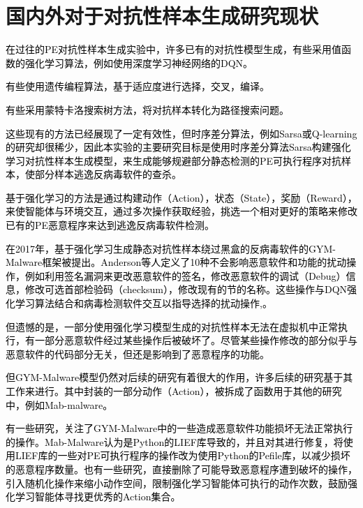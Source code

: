 \section{国内外对于对抗性样本生成研究现状}

\textcolor{black}{在过往的PE对抗性样本生成实验中，许多已有的对抗性模型生成，有些采用值函数的强化学习算法，例如使用深度学习神经网络的DQN\parencite{ref9}。}

\textcolor{black}{有些使用遗传编程算法，基于适应度进行选择，交叉，编译\parencite{ref10}。}

\textcolor{black}{有些采用蒙特卡洛搜索树方法，将对抗样本转化为路径搜索问题\parencite{ref11}。}

\textcolor{black}{这些现有的方法已经展现了一定有效性，但时序差分算法，例如Sarsa或Q-learning的研究却很稀少，因此本实验的主要研究目标是使用时序差分算法Sarsa构建强化学习对抗性样本生成模型，来生成能够规避部分静态检测的PE可执行程序对抗样本，使部分样本逃逸反病毒软件的查杀。}

\textcolor{black}{基于强化学习的方法是通过构建动作（Action），状态（State），奖励（Reward），来使智能体与环境交互，通过多次操作获取经验，挑选一个相对更好的策略来修改已有的PE恶意程序来达到逃逸反病毒软件检测。}

\textcolor{black}{在2017年，基于强化学习生成静态对抗性样本绕过黑盒的反病毒软件的GYM-Malware框架被提出。Anderson等人定义了10种不会影响恶意软件和功能的扰动操作，例如利用签名漏洞来更改恶意软件的签名，修改恶意软件的调试（Debug）信息，修改可选首部检验码（checksum），修改现有的节的名称。这些操作与DQN强化学习算法结合和病毒检测软件交互以指导选择的扰动操作\parencite{ref9},\parencite{ref13}。}

\textcolor{black}{但遗憾的是，一部分使用强化学习模型生成的对抗性样本无法在虚拟机中正常执行，有一部分恶意软件经过某些操作后被破坏了。尽管某些操作修改的部分似乎与恶意软件的代码部分无关，但还是影响到了恶意程序的功能\parencite{ref8}。}

\textcolor{black}{但GYM-Malware模型仍然对后续的研究有着很大的作用，许多后续的研究基于其工作来进行。其中封装的一部分动作（Action），被拆成了函数用于其他的研究中，例如Mab-malware。}

\textcolor{black}{有一些研究\parencite{ref14}，关注了GYM-Malware中的一些造成恶意软件功能损坏无法正常执行的操作。Mab-Malware认为是Python的LIEF库导致的，并且对其进行修复，将使用LIEF库的一些对PE可执行程序的操作改为使用Python的Pefile库，以减少损坏的恶意程序数量。也有一些研究\parencite{ref15}，直接删除了可能导致恶意程序遭到破坏的操作，引入随机化操作来缩小动作空间，限制强化学习智能体可执行的动作次数，鼓励强化学习智能体寻找更优秀的Action集合。}


